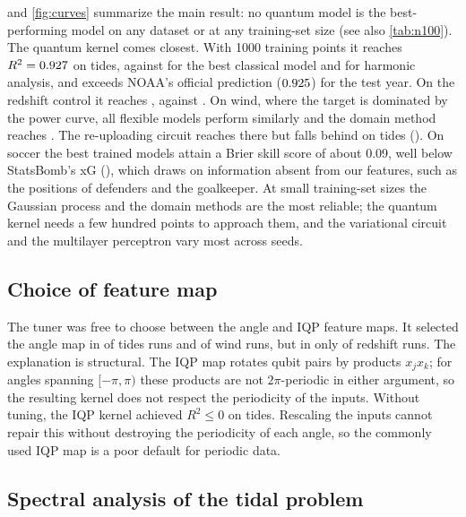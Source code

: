 \documentclass[11pt,letterpaper]{article}
\begin{document}
 and \cref{fig:curves} summarize the main result: no quantum model is the
best-performing model on any dataset or at any training-set size (see also \cref{tab:n100}).
The quantum kernel comes closest. With 1000 training points it reaches $R^2=0.927$ on
tides, against \tidesBestCl{} for the best classical model and \tidesDom{} for harmonic
analysis, and exceeds NOAA's official prediction ($0.925$) for the test year. On the
redshift control it reaches \photozQK{}, against \photozBestCl{}. On wind, where the target is
dominated by the power curve, all flexible models perform similarly and the domain method
reaches \windDom{}. The re-uploading circuit reaches \windVQC{} there but falls behind on tides
(\tidesVQC{}). On soccer the best trained models attain a Brier skill score of about 0.09,
well below StatsBomb's xG (\soccerSB{}), which draws on information absent from our features,
such as the positions of defenders and the goalkeeper. At small training-set sizes the Gaussian
process and the domain methods are the most reliable; the quantum kernel needs a few hundred
points to approach them, and the variational circuit and the multilayer perceptron vary most
across seeds.

\subsection{Choice of feature map}

The tuner was free to choose between the angle and IQP feature maps. It selected the angle
map in \qkAngleTides{} of \qkRunsTides{} tides runs and \qkAngleWind{} of \qkRunsWind{} wind
runs, but in only \qkAnglePhotoz{} of \qkRunsPhotoz{} redshift runs. The explanation is
structural. The IQP map rotates qubit pairs by products $x_jx_k$; for angles spanning
$[-\pi,\pi)$ these products are not $2\pi$-periodic in either argument, so the resulting
kernel does not respect the periodicity of the inputs. Without tuning, the IQP kernel
achieved $R^2\le 0$ on tides. Rescaling the inputs cannot repair this without destroying the
periodicity of each angle, so the commonly used IQP map is a poor default for periodic data.

\subsection{Spectral analysis of the tidal problem}

\begin{table}[t]
\centering\small
\caption{\label{tab:ceil}Spectrum ceilings for tides: test $R^2$ of the least-squares fit on
each frequency set, using all training hours. $\Omega_1^{\mathrm{add}}\subset\Omega_1$
contains only frequencies with a single nonzero component.}

\end{table}
\end{document}
